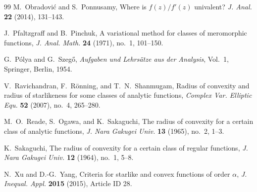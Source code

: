 \documentclass[12pt]{article}
\begin{document}
\begin{thebibliography}{99}
M.~Obradovi\'c and S.~Ponnusamy,
Where is $f(z)/f'(z)$ univalent?
\emph{J. Anal.}
\textbf{22} (2014), 131--143.

J.~Pfaltzgraff and B.~Pinchuk,
A variational method for classes of meromorphic functions,
\emph{J. Anal. Math.}
\textbf{24} (1971), no.~1, 101--150.

G.~P\'olya and G.~Szeg\H{o},
\emph{Aufgaben und Lehrs\"atze aus der Analysis},
Vol.~1, Springer, Berlin, 1954.

V.~Ravichandran, F.~R\"onning, and T.~N.~Shanmugam,
Radius of convexity and radius of starlikeness for some classes of analytic functions,
\emph{Complex Var. Elliptic Equ.}
\textbf{52} (2007), no.~4, 265--280.

M.~O.~Reade, S.~Ogawa, and K.~Sakaguchi,
The radius of convexity for a certain class of analytic functions,
\emph{J. Nara Gakugei Univ.}
\textbf{13} (1965), no.~2, 1--3.

K.~Sakaguchi,
The radius of convexity for a certain class of regular functions,
\emph{J. Nara Gakugei Univ.}
\textbf{12} (1964), no.~1, 5--8.

N.~Xu and D.-G.~Yang,
Criteria for starlike and convex functions of order $\alpha$,
\emph{J. Inequal. Appl.}
\textbf{2015} (2015), Article ID 28.

\end{thebibliography}
\end{document}
